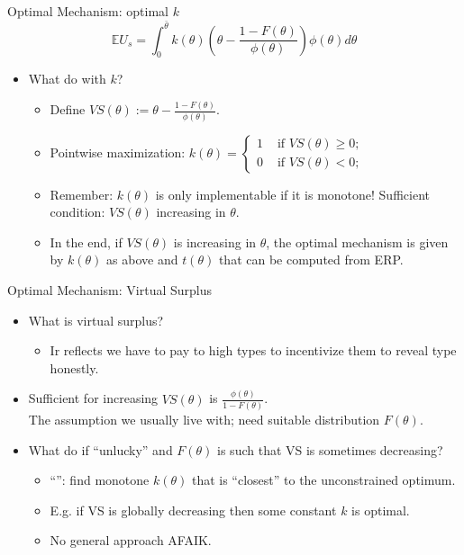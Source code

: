 \documentclass[english,10pt
,aspectratio=169
]{beamer}
\begin{document}
\begin{frame}{Optimal Mechanism: optimal $k$}
\begin{equation*}
	\mathbb{E} U_s = \int_0^{\bar{\theta}} k(\theta) \left( \theta - \frac{1-F(\theta)}{\phi(\theta)} \right) \phi(\theta) d\theta
\end{equation*}
\begin{itemize}
	\item What do with $k$?
	\begin{itemize}[<+->]
		\item Define  $VS(\theta) := \theta - \frac{1-F(\theta)}{\phi(\theta)}$.
		\item Pointwise maximization: 
		$k(\theta) = \begin{cases}
			1 & \text{ if } VS(\theta) \geq 0;
			\\ 0 & \text{ if } VS(\theta) < 0;
		\end{cases}$
		\item Remember: $k(\theta)$ is only implementable if it is monotone! Sufficient condition: $VS(\theta)$ increasing in $\theta$.
		\item In the end, if $VS(\theta)$ is increasing in $\theta$, the optimal mechanism is given by $k(\theta)$ as above and $t(\theta)$ that can be computed from ERP.
	\end{itemize}
\end{itemize}
\end{frame}


\begin{frame}{Optimal Mechanism: Virtual Surplus}
\begin{itemize}
	\item What is virtual surplus?
	\begin{itemize}
		\item Ir reflects  we have to pay to high types to incentivize them to reveal type honestly.
	\end{itemize}
	\item Sufficient for increasing $VS(\theta)$ is  $\frac{\phi(\theta)}{1-F(\theta)}$. \\ 
	The assumption we usually live with; need suitable distribution $F(\theta)$.
	\item What do if ``unlucky'' and $F(\theta)$ is such that VS is sometimes decreasing?
	\begin{itemize}
		\item ``'': find monotone $k(\theta)$ that is ``closest'' to the unconstrained optimum.
		\item E.g. if VS is globally decreasing then some constant $k$ is optimal.
		\item No general approach AFAIK.
	\end{itemize}
\end{itemize}
\end{frame}
\end{document}
